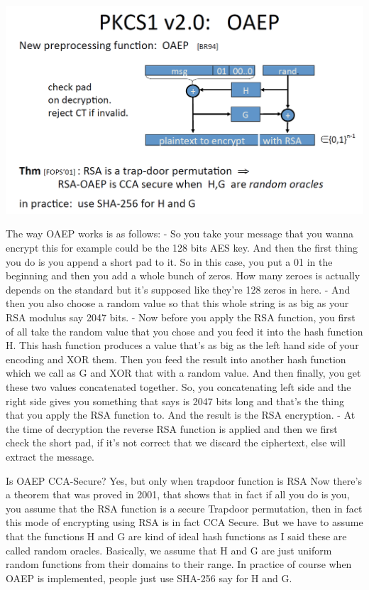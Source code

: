 \documentclass[11pt]{article}
\makeatletter
\def\maxwidth{\ifdim\Gin@nat@width>\linewidth\linewidth
    \else\Gin@nat@width\fi}
\let\Oldincludegraphics\includegraphics
\renewcommand{\includegraphics}[1]{\Oldincludegraphics[width=.8\maxwidth]{#1}}
\makeatother
\begin{document}
\includegraphics{./Images/PKCS-OAEP.png}

The way OAEP works is as follows: - So you take your message that you
wanna encrypt this for example could be the 128 bits AES key. And then
the first thing you do is you append a short pad to it. So in this case,
you put a 01 in the beginning and then you add a whole bunch of zeros.
How many zeroes is actually depends on the standard but it's supposed
like they're 128 zeros in here. - And then you also choose a random
value so that this whole string is as big as your RSA modulus say 2047
bits. - Now before you apply the RSA function, you first of all take the
random value that you chose and you feed it into the hash function H.
This hash function produces a value that's as big as the left hand side
of your encoding and XOR them. Then you feed the result into another
hash function which we call as G and XOR that with a random value. And
then finally, you get these two values concatenated together. So, you
concatenating left side and the right side gives you something that says
is 2047 bits long and that's the thing that you apply the RSA function
to. And the result is the RSA encryption. - At the time of decryption
the reverse RSA function is applied and then we first check the short
pad, if it's not correct that we discard the ciphertext, else will
extract the message.

Is OAEP CCA-Secure? Yes, but only when trapdoor function is RSA Now
there's a theorem that was proved in 2001, that shows that in fact if
all you do is you, you assume that the RSA function is a secure Trapdoor
permutation, then in fact this mode of encrypting using RSA is in fact
CCA Secure. But we have to assume that the functions H and G are kind of
ideal hash functions as I said these are called random oracles.
Basically, we assume that H and G are just uniform random functions from
their domains to their range. In practice of course when OAEP is
implemented, people just use SHA-256 say for H and G.
\end{document}
